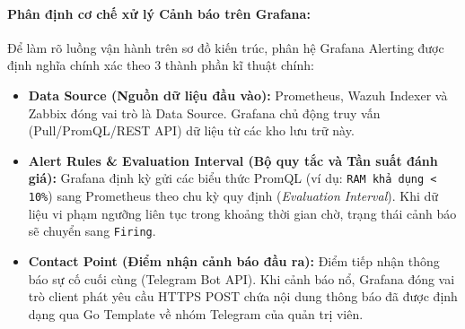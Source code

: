 \documentclass[13pt,a4paper]{extarticle}
\begin{document}
\paragraph{Phân định cơ chế xử lý Cảnh báo trên Grafana:}
Để làm rõ luồng vận hành trên sơ đồ kiến trúc, phân hệ Grafana Alerting được định nghĩa chính xác theo 3 thành phần kĩ thuật chính:
\begin{itemize}
    \item \textbf{Data Source (Nguồn dữ liệu đầu vào):} Prometheus, Wazuh Indexer và Zabbix đóng vai trò là Data Source. Grafana chủ động truy vấn (Pull/PromQL/REST API) dữ liệu từ các kho lưu trữ này.
    \item \textbf{Alert Rules \& Evaluation Interval (Bộ quy tắc và Tần suất đánh giá):} Grafana định kỳ gửi các biểu thức PromQL (ví dụ: \texttt{RAM khả dụng < 10\%}) sang Prometheus theo chu kỳ quy định (\textit{Evaluation Interval}). Khi dữ liệu vi phạm ngưỡng liên tục trong khoảng thời gian chờ, trạng thái cảnh báo sẽ chuyển sang \texttt{Firing}.
    \item \textbf{Contact Point (Điểm nhận cảnh báo đầu ra):} Điểm tiếp nhận thông báo sự cố cuối cùng (Telegram Bot API). Khi cảnh báo nổ, Grafana đóng vai trò client phát yêu cầu HTTPS POST chứa nội dung thông báo đã được định dạng qua Go Template về nhóm Telegram của quản trị viên.
\end{itemize}
\end{document}
